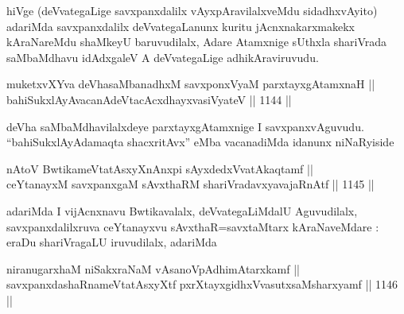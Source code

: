 \begin{artha}
hiVge (deVvategaLige savxpanxdalilx vAyxpAravilalxveMdu sidadhxvAyito) adariMda savxpanxdalilx deVvategaLanunx kuritu jAcnxnakarxmakekx kAraNareMdu shaMkeyU baruvudilalx, Adare Atamxnige sUthxla shariVrada saMbaMdhavu idAdxgaleV A deVvategaLige adhikAraviruvudu.
\end{artha}


\begin{shl}
muketxvXYva deVhasaMbanadhxM savxponxV\s yaM parxtayxgAtamxnaH || \\
bahiSukxlAyAvacanAdeVtacAcxdhayxvasiVyateV \hfill || 1144 ||
\end{shl}

\begin{artha}
deVha saMbaMdhavilalxdeye parxtayxgAtamxnige I savxpanxvAguvudu. ``bahiSukxlAyAdamaqta shacxritAvx'' eMba vacanadiMda idanunx niNaRyiside
\end{artha}


\begin{shl}
nAtoV BwtikameVtatAsxyXnAnxpi sAyxdedxVvatAkaqtamf || \\
ceYtanayxM savxpanxgaM sAvxthaRM shariVradavxyavajaRnAtf \hfill || 1145 ||  
\end{shl}

\begin{artha}
adariMda I vijAcnxnavu Bwtikavalalx, deVvategaLiMdalU Aguvudilalx, savxpanxdalilxruva ceYtanayxvu sAvxthaR=savxtaMtarx kAraNaveMdare : eraDu shariVragaLU iruvudilalx, adariMda
\end{artha}

\begin{shl}
\footnotemark[1]niranugarxhaM \footnotemark[2]niSakxraNaM \footnotemark[3]vAsanoVpAdhimAtarxkamf || \\
savxpanxdashaRnameVtatAsxyXtf \footnotemark[4]pxrXtayxgidhxVvasutxsaMsharxyamf \hfill || 1146 ||  
\end{shl}

